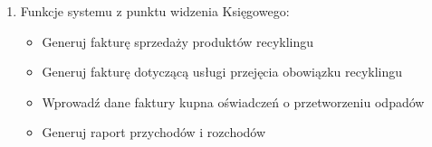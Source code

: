 \begin{enumerate}
\item Funkcje systemu z punktu widzenia Księgowego:
	\begin{itemize}
		\item Generuj fakturę sprzedaży produktów recyklingu
		\item Generuj fakturę dotyczącą usługi przejęcia obowiązku recyklingu
		\item Wprowadź dane faktury kupna oświadczeń o przetworzeniu odpadów
		\item Generuj raport przychodów i rozchodów
	\end{itemize}

\end{enumerate}
